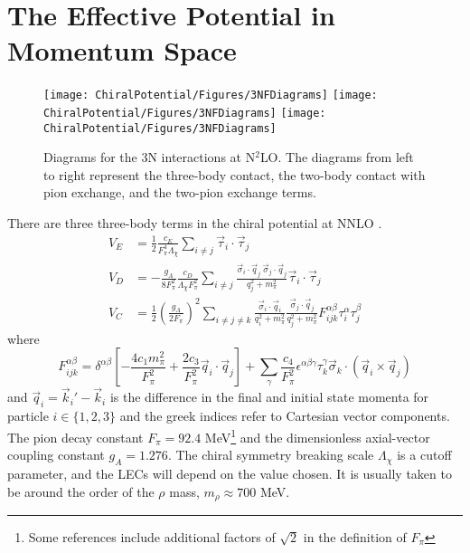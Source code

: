 \section{\label{sec:momentum}The Effective Potential in Momentum Space}

\begin{figure}
\centering
\texttt{[image: ChiralPotential/Figures/3NFDiagrams]}
\texttt{[image: ChiralPotential/Figures/3NFDiagrams]}
\texttt{[image: ChiralPotential/Figures/3NFDiagrams]}
\caption[Diagrams for the 3N interactions at N$^2$LO]{\label{fig:3NF}Diagrams for the 3N interactions at N$^2$LO. The diagrams from left to right represent the three-body contact, the two-body contact with pion exchange, and the two-pion exchange terms. }
\end{figure}

There are three three-body terms in the chiral potential at NNLO \cite{PhysRevC.66.064001}. 
\begin{align}
V_E&=\frac{1}{2}\frac{c_E }{F_\pi^4\Lambda_\chi}\sum_{i\neq j} \vec{\tau}_i\cdot\vec{\tau}_j \label{eq:V_E} \\
V_D&=-\frac{ g_A}{8F_\pi^2}\frac{c_D}{\Lambda_\chi F_\pi^2}\sum_{i\neq j } \frac{ \vec{\sigma}_i\cdot\vec{q}_j\:\vec{\sigma}_j\cdot\vec{q}_j }{q^2_j+m_\pi^2} \vec{\tau}_i\cdot\vec{\tau}_j \label{eq:V_D}\\
V_{C} &= \frac{1}{2}\left(\frac{g_A}{2F_\pi}\right)^2\sum_{i\neq j \neq k} \frac{ \vec{\sigma}_i\cdot\vec{q}_i}{q_i^2+m_\pi^2}\frac{\vec{\sigma}_j\cdot\vec{q}_j }{q^2_j+m_\pi^2} F_{ijk}^{\alpha\beta}\tau_i^{\alpha}\tau_j^\beta \label{eq:V_C}
\end{align}
%
where 
\begin{equation}
F_{ijk}^{\alpha\beta}=\delta^{\alpha \beta}\left[-\frac{4c_1m_\pi^2}{F_\pi^2}+\frac{2c_3}{F_\pi^2}\vec{q}_i\cdot\vec{q}_j\right]+\sum_\gamma\frac{c_4}{F_\pi^2}\epsilon^{\alpha\beta\gamma}\tau^\gamma_k\vec{\sigma}_k\cdot\left(\vec{q}_i\times\vec{q}_j\right)
\end{equation}
and $\vec{q}_i=\vec{k}_i' - \vec{k}_i$ is the difference in the final and initial state momenta for particle $i \in \{1,2,3\}$ and the greek indices refer to Cartesian vector components. The pion decay constant $F_\pi=92.4$ MeV\footnote{Some references include additional factors of $\sqrt{2}$ in the definition of $F_\pi$}  and the dimensionless axial-vector coupling constant $g_A=1.276$. The chiral symmetry breaking scale $\Lambda_\chi$ is a cutoff parameter, and the LECs will depend on the value chosen. It is usually taken to be around the order of the $\rho$ mass, $m_\rho\approx700$ MeV.

